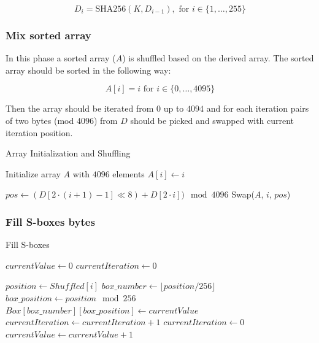 \documentclass{article} %
\begin{document}
\begin{equation}
  D_i = \text{SHA256}(K, D_{i-1}), \text{ for } i \in \{1, \ldots, 255\}
\end{equation}

\subsubsection{Mix sorted array}
In this phase a sorted array ($A$) is shuffled based on the derived array.
The sorted array should be sorted in the following way:

\begin{equation}
  A[i] = i \text{ for } i \in \{0, \ldots, 4095\}
\end{equation}

Then the array should be iterated from $0$ up to $4094$ and for each iteration pairs of two bytes (mod $4096$) from $D$ should be picked and swapped with current iteration position.

\begin{algorithm}
  \caption{Array Initialization and Shuffling}
  \begin{algorithmic}[1]
  \State Initialize array $A$ with $4096$ elements
      \State $A[i] \gets i$
  \EndFor
  
      \State $pos \gets (D[2 \cdot (i+1) - 1] \ll 8) + D[2 \cdot i]) \mod 4096$
      \State Swap($A$, $i$, $pos$)
  \EndFor
  \end{algorithmic}
\end{algorithm}


\subsubsection{Fill S-boxes bytes}

\begin{algorithm}
  \caption{Fill S-boxes}
  \begin{algorithmic}[1]

    \State $currentValue \gets 0$
    \State $currentIteration \gets 0$

      \State $position \gets Shuffled[i]$
      \State $box\_number \gets \lfloor position / 256 \rfloor$
      \State $box\_position \gets position \mod 256$
      \State $Box[box\_number][box\_position] \gets currentValue$
      \State $currentIteration \gets currentIteration + 1$
          \State $currentIteration \gets 0$
          \State $currentValue \gets currentValue + 1$
      \EndIf
    \EndFor

  \end{algorithmic}
\end{algorithm} 
\end{document}
